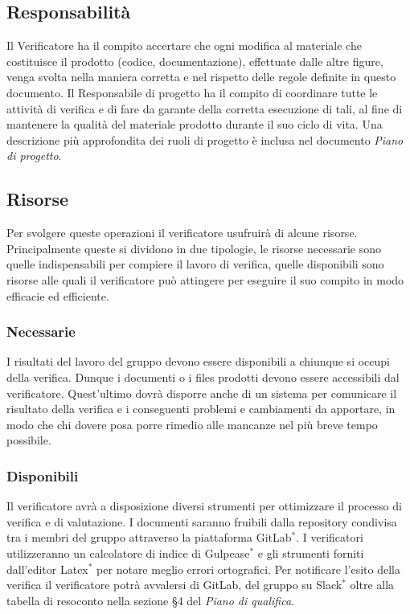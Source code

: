 \subsection{Responsabilità}
Il Verificatore ha il compito accertare che ogni modifica al materiale che costituisce il prodotto (codice, documentazione), effettuate dalle altre figure, venga svolta nella maniera corretta e nel rispetto delle regole definite in questo documento. Il Responsabile di progetto ha il compito di coordinare tutte le attività di verifica e di fare da garante della corretta esecuzione di tali, al fine di mantenere la qualità del materiale prodotto durante il suo ciclo di vita. Una descrizione più approfondita dei ruoli di progetto è inclusa nel documento  \textit{Piano di progetto}.

\subsection{Risorse}
Per svolgere queste operazioni il verificatore usufruirà di alcune risorse. Principalmente queste si dividono in due tipologie, le risorse necessarie sono quelle indispensabili per compiere il lavoro di verifica, quelle disponibili sono risorse alle quali il verificatore può attingere per eseguire il suo compito in modo efficacie ed efficiente.

\subsubsection{Necessarie}
I risultati del lavoro del gruppo devono essere disponibili a chiunque si occupi della verifica. Dunque i documenti o i files prodotti devono essere accessibili dal verificatore. Quest'ultimo dovrà disporre anche di un sistema per comunicare il risultato della verifica e i conseguenti problemi e cambiamenti da apportare, in modo che chi dovere posa porre rimedio alle mancanze nel più breve tempo possibile.

\subsubsection{Disponibili}
Il verificatore avrà a disposizione diversi strumenti per ottimizzare il processo di verifica e di valutazione. I documenti saranno fruibili dalla repository condivisa tra i membri del gruppo attraverso la piattaforma GitLab$^*$. I verificatori utilizzeranno un calcolatore di indice di Gulpease$^*$ e gli strumenti forniti dall'editor Latex$^*$ per notare meglio errori ortografici. Per notificare l'esito della verifica il verificatore potrà avvalersi di GitLab, del gruppo su Slack$^*$ oltre alla tabella di resoconto nella sezione §4 del \textit{Piano di qualifica}.

